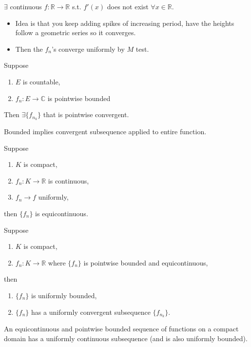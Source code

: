 \begin{theorem}
  $ \exists $ continuous  $ f\colon \mathbb{R}\to \mathbb{R} $
  s.t.  $ f'(x) $ does not exist  $ \forall x \in \mathbb{R} $.
  \begin{itemize}
    \item Idea is that you keep adding spikes of increasing period,
      have the heights follow a geometric series so it converges.
    \item Then the $ f_n $'s converge uniformly by  $ M $ test.
  \end{itemize}
\end{theorem}

\setcounter{theorem}{22}

\begin{theorem}
  Suppose
  \begin{enumerate}
    \item $ E $ is countable,
    \item  $ f_n \colon E \to \mathbb{C} $ is pointwise bounded
  \end{enumerate}

  Then $ \exists \{f_{n_k}\} $ that is pointwise convergent.

  Bounded implies convergent subsequence applied to entire function.
\end{theorem}

\begin{theorem}
  Suppose
  \begin{enumerate}
    \item $ K $ is compact,
    \item $ f_n\colon K \to \mathbb{R} $ is continuous,
    \item  $ f_n \to f $ uniformly,
  \end{enumerate}

  then $ \{f_n\} $ is equicontinuous.
\end{theorem}

\newpage
\begin{theorem}
  Suppose
  \begin{enumerate}
     \item $ K $ is compact,
     \item $ f_n \colon K \to \mathbb{R} $ where  $ \{f_n\} $ is pointwise bounded and equicontinuous,
  \end{enumerate}
  then 
  \begin{enumerate}
    \item $ \{f_n\} $ is uniformly bounded,
    \item $ \{f_n\} $ has a uniformly convergent subsequence  $ \{f_{n_k}\} $.
  \end{enumerate}

  An equicontinuous and pointwise bounded sequence of functions on a compact domain
  has a uniformly continuous subsequence (and is also uniformly bounded).
\end{theorem}

